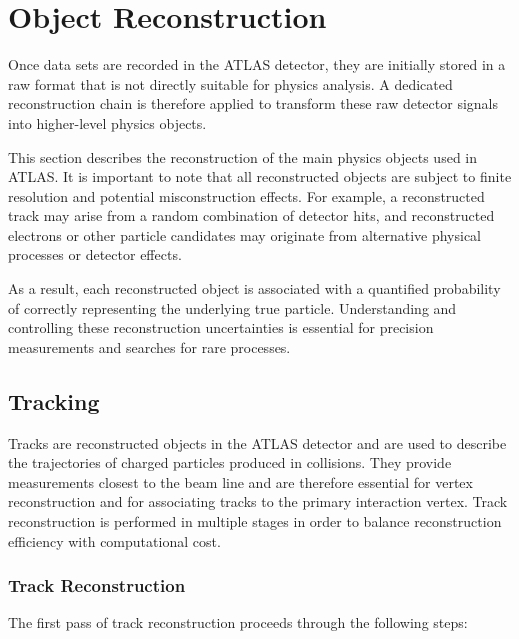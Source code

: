 \chapter{Object Reconstruction}

Once data sets are recorded in the ATLAS detector, they are initially stored in a raw format that is not directly suitable for physics analysis. A dedicated reconstruction chain is therefore applied to transform these raw detector signals into higher-level physics objects.

This section describes the reconstruction of the main physics objects used in ATLAS. It is important to note that all reconstructed objects are subject to finite resolution and potential misconstruction effects. For example, a reconstructed track may arise from a random combination of detector hits, and reconstructed electrons or other particle candidates may originate from alternative physical processes or detector effects.

As a result, each reconstructed object is associated with a quantified probability of correctly representing the underlying true particle. Understanding and controlling these reconstruction uncertainties is essential for precision measurements and searches for rare processes.


\section{Tracking}

Tracks are reconstructed objects in the ATLAS detector and are used to describe the trajectories of charged particles produced in \pp collisions. 
They provide measurements closest to the beam line and are therefore essential for vertex reconstruction and for associating tracks to the primary interaction vertex. 
Track reconstruction is performed in multiple stages in order to balance reconstruction efficiency with computational cost.



\subsection{Track Reconstruction}

The first pass of track reconstruction proceeds through the following steps:

